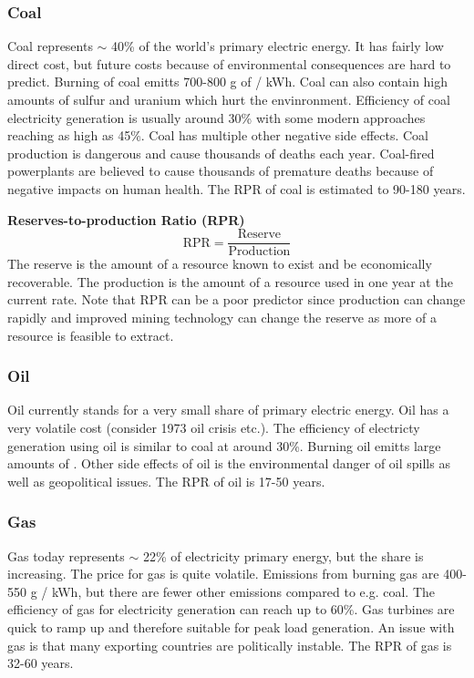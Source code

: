 \subsubsection{Coal}
Coal represents $\sim$ 40\% of the world's primary electric energy.
It has fairly low direct cost, but future costs because of environmental consequences are hard to predict.
Burning of coal emitts 700-800 g of \cotwo / kWh. Coal can also contain high amounts of sulfur and uranium which hurt the envinronment.
Efficiency of coal electricity generation is usually around 30\% with some modern approaches reaching as high as 45\%.
Coal has multiple other negative side effects.
Coal production is dangerous and cause thousands of deaths each year.
Coal-fired powerplants are believed to cause thousands of premature deaths because of negative impacts on human health.
The RPR of coal is estimated to 90-180 years.\\

\begin{tcolorbox}
    \textbf{Reserves-to-production Ratio (RPR)}\\
    $$
    \text{RPR} = \frac{\text{Reserve}}{\text{Production}}
    $$
    The reserve is the amount of a resource known to exist and be economically recoverable.
    The production is the amount of a resource used in one year at the current rate.
    Note that RPR can be a poor predictor since production can change rapidly and improved mining technology can change the reserve as more of a resource is feasible to extract.
\end{tcolorbox}

\subsubsection{Oil}
Oil currently stands for a very small share of primary electric energy.
Oil has a very volatile cost (consider 1973 oil crisis etc.).
The efficiency of electricty generation using oil is similar to coal at around 30\%.
Burning oil emitts large amounts of \cotwo.
Other side effects of oil is the environmental danger of oil spills as well as geopolitical issues.
The RPR of oil is 17-50 years.

\subsubsection{Gas}
Gas today represents $\sim$ 22\% of electricity primary energy, but the share is increasing.
The price for gas is quite volatile.
Emissions from burning gas are 400-550 g \cotwo / kWh, but there are fewer other emissions compared to e.g. coal.
The efficiency of gas for electricity generation can reach up to 60\%.
Gas turbines are quick to ramp up and therefore suitable for peak load generation.
An issue with gas is that many exporting countries are politically instable.
The RPR of gas is 32-60 years.

